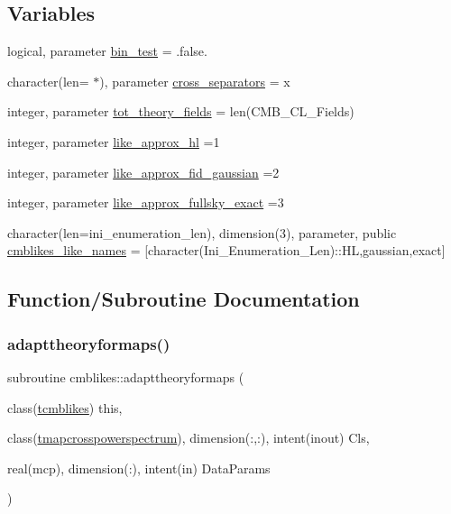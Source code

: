 \subsection*{Variables}
\begin{DoxyCompactItemize}
\item 
logical, parameter \mbox{\hyperlink{namespacecmblikes_a109d8823809382a8545c68b8598c8a06}{bin\+\_\+test}} = .false.
\item 
character(len= $\ast$), parameter \mbox{\hyperlink{namespacecmblikes_a55c986dc536bdd0894cd5bf2fb584f70}{cross\+\_\+separators}} = \textquotesingle{}x\textquotesingle{}
\item 
integer, parameter \mbox{\hyperlink{namespacecmblikes_a9a7a0c55bde53b41f76027a48c8eb811}{tot\+\_\+theory\+\_\+fields}} = len(C\+M\+B\+\_\+\+C\+L\+\_\+\+Fields)
\item 
integer, parameter \mbox{\hyperlink{namespacecmblikes_a9177762dd30aeda08fb17357714b0157}{like\+\_\+approx\+\_\+hl}} =1
\item 
integer, parameter \mbox{\hyperlink{namespacecmblikes_abf83af8cd899e4118189181fe7290a44}{like\+\_\+approx\+\_\+fid\+\_\+gaussian}} =2
\item 
integer, parameter \mbox{\hyperlink{namespacecmblikes_ae1ff0c9c884675bf7a8de01c01e5b082}{like\+\_\+approx\+\_\+fullsky\+\_\+exact}} =3
\item 
character(len=ini\+\_\+enumeration\+\_\+len), dimension(3), parameter, public \mbox{\hyperlink{namespacecmblikes_abc590f6fd0bd85c7afe4fed208f61b3e}{cmblikes\+\_\+like\+\_\+names}} = \mbox{[}character(Ini\+\_\+\+Enumeration\+\_\+\+Len)\+::\textquotesingle{}HL\textquotesingle{},\textquotesingle{}gaussian\textquotesingle{},\textquotesingle{}exact\textquotesingle{}\mbox{]}
\end{DoxyCompactItemize}


\subsection{Function/\+Subroutine Documentation}
\mbox{\label{namespacecmblikes_a3015ed6ed745619906f28edd67ff390c}} 
\subsubsection{\texorpdfstring{adapttheoryformaps()}{adapttheoryformaps()}}
{\footnotesize\ttfamily subroutine cmblikes\+::adapttheoryformaps (\begin{DoxyParamCaption}\item[{class(\mbox{\hyperlink{structcmblikes_1_1tcmblikes}{tcmblikes}})}]{this,  }\item[{class(\mbox{\hyperlink{structcmblikes_1_1tmapcrosspowerspectrum}{tmapcrosspowerspectrum}}), dimension(\+:,\+:), intent(inout)}]{Cls,  }\item[{real(mcp), dimension(\+:), intent(in)}]{Data\+Params }\end{DoxyParamCaption})\hspace{0.3cm}{\ttfamily [private]}}



